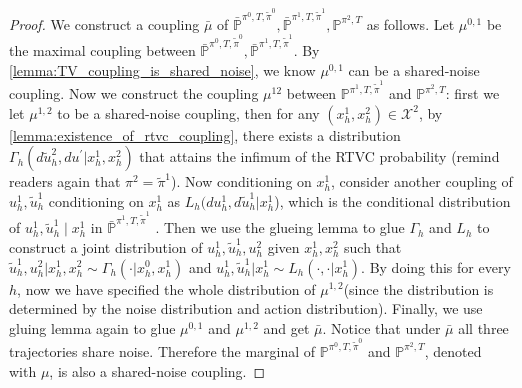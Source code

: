 \documentclass{article}
\begin{document}
\begin{proof}
We construct a coupling $\bar \mu$ of $\bar {\mathbb P}^{\pi^0, T,\tilde \pi^0},  \bar {\mathbb P}^{\pi^1, T,\tilde \pi^1}, \mathbb P^{\pi^2, T}$ as follows. Let $\mu^{0,1}$ be the maximal coupling between $\bar {\mathbb P}^{\pi^0, T,\tilde \pi^0},  \bar {\mathbb P}^{\pi^1, T,\tilde \pi^1}$. By \cref{lemma:TV_coupling_is_shared_noise}, we know $\mu^{0,1}$ can be a shared-noise coupling. Now we construct the coupling  $\mu^{12}$ between $\mathbb P^{\pi^1, T,\tilde \pi^1}$ and $\mathbb P^{\pi^2, T}$:  first we let $\mu^{1,2}$ to be a shared-noise coupling, then for any $(x_h^1,x_h^2)\in \mathcal X^2$, by \cref{lemma:existence_of_rtvc_coupling}, there exists a distribution $\Gamma_h(d\tilde u_h^2,du^\prime|x_h^1, x_h^2)$ that attains the infimum of the RTVC probability (remind readers again that $\pi^2=\tilde \pi^1$). Now conditioning on $x_h^1$, consider another coupling of $u_h^1,\tilde u_h^1$ conditioning on $x_h^1$ as $L_h(du_h^1,d\tilde u_h^1|x_h^1$), which is the conditional distribution of $u_h^1, \tilde u_h^1\mid x_h^1$ in $\bar {\mathbb P}^{\pi^1, T,\tilde \pi^1}$ . Then we use the glueing lemma to glue $\Gamma_h$ and $L_h$ to construct a joint distribution of $u_h^1,\tilde u_h^1, u_h^2$ given $x_h^1, x_h^2$ such that $\tilde u_h^1, u_h^2|x_h^1, x_h^2\sim \Gamma_h(\cdot|x_h^0, x_h^1)$ and $u_h^1,\tilde u_h^1|x_h^1\sim L_h(\cdot,\cdot|x_h^1)$. By doing this for every $h$, now we have specified the whole distribution of $\mu^{1,2}$(since the distribution is determined by the noise distribution and action distribution). Finally, we use gluing lemma again to glue $\mu^{0,1}$ and $\mu^{1,2}$ and get $\bar \mu$. Notice that under $\bar \mu$ all three trajectories share noise. Therefore the marginal of $\mathbb P^{\pi^0, T,\tilde \pi^0}$ and $\mathbb P^{\pi^2, T}$, denoted with $\mu$, is also a shared-noise coupling.


\end{proof}
\end{document}

